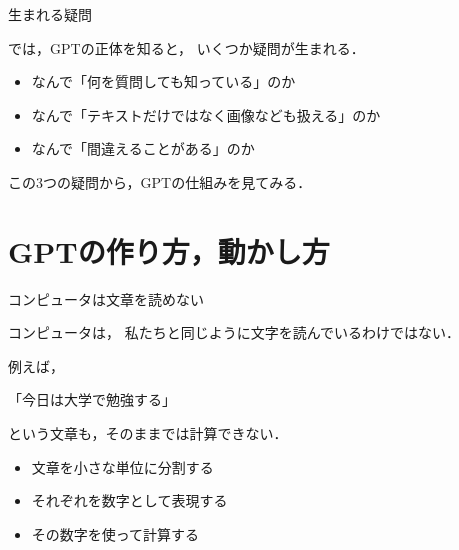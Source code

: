 \documentclass[aspectratio=169,professionalfonts]{beamer}
\begin{document}
\begin{frame}{生まれる疑問}

  では，GPTの正体を知ると，
  いくつか疑問が生まれる．

  \vspace{1em}

  \begin{itemize}
    \item なんで「何を質問しても知っている」のか

    \item なんで「テキストだけではなく画像なども扱える」のか

    \item なんで「間違えることがある」のか
  \end{itemize}

  \vspace{1em}

  この3つの疑問から，GPTの仕組みを見てみる．


\end{frame}



\section{GPTの作り方，動かし方}

\begin{frame}{コンピュータは文章を読めない}

  コンピュータは，
  私たちと同じように文字を読んでいるわけではない．

  \vspace{1em}

  例えば，

  \begin{center}
    「今日は大学で勉強する」
  \end{center}

  という文章も，そのままでは計算できない．

  \vspace{1em}

  \begin{itemize}
    \item 文章を小さな単位に分割する
    \item それぞれを数字として表現する
    \item その数字を使って計算する
  \end{itemize}


\end{frame}
\end{document}
